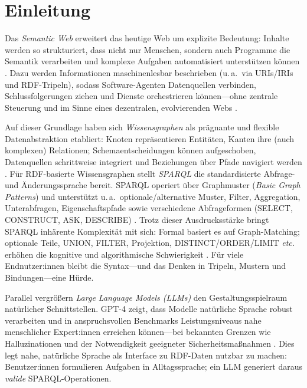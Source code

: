 
\chapter{Einleitung}\label{sec:Einleitung}

Das \emph{Semantic Web} erweitert das heutige Web um explizite Bedeutung: Inhalte werden so strukturiert, dass nicht nur Menschen, sondern auch Programme die Semantik verarbeiten und komplexe Aufgaben automatisiert unterstützen können \cite{bernersLee2001}. Dazu werden Informationen maschinenlesbar beschrieben (u.\,a.\ via URIs/IRIs und RDF-Tripeln), sodass Software-Agenten Datenquellen verbinden, Schlussfolgerungen ziehen und Dienste orchestrieren können—ohne zentrale Steuerung und im Sinne eines dezentralen, evolvierenden Webs \cite{bernersLee2001}.

Auf dieser Grundlage haben sich \emph{Wissensgraphen} als prägnante und flexible Datenabstraktion etabliert: Knoten repräsentieren Entitäten, Kanten ihre (auch komplexen) Relationen; Schemaentscheidungen können aufgeschoben, Datenquellen schrittweise integriert und Beziehungen über Pfade navigiert werden \cite{hogan2021}. Für RDF-basierte Wissensgraphen stellt \emph{SPARQL} die standardisierte Abfrage- und Änderungs\-sprache bereit. SPARQL operiert über Graphmuster (\emph{Basic Graph Patterns}) und unterstützt u.\,a.\ optionale/alternative Muster, Filter, Aggregation, Unterabfragen, Eigenschaftspfade sowie verschiedene Abfrageformen (SELECT, CONSTRUCT, ASK, DESCRIBE) \cite{w3cSparql11}. Trotz dieser Ausdrucksstärke bringt SPARQL inhärente Komplexität mit sich: Formal basiert es auf Graph-Matching; optionale Teile, UNION, FILTER, Projektion, DISTINCT/ORDER/LIMIT \emph{etc.} erhöhen die kognitive und algorithmische Schwierigkeit \cite{perezGutierrezSparql}. Für viele Endnutzer:innen bleibt die Syntax—und das Denken in Tripeln, Mustern und Bindungen—eine Hürde.

Parallel vergrößern \emph{Large Language Models (LLMs)} den Gestaltungsspielraum natürlicher Schnittstellen. GPT-4 zeigt, dass Modelle natürliche Sprache robust verarbeiten und in anspruchsvollen Benchmarks Leistungsniveaus nahe menschlicher Expert:innen erreichen können—bei bekannten Grenzen wie Halluzinationen und der Notwendigkeit geeigneter Sicherheitsmaßnahmen \cite{openaiGPT42023}. Dies legt nahe, natürliche Sprache als Interface zu RDF-Daten nutzbar zu machen: Benutzer:innen formulieren Aufgaben in Alltagssprache; ein LLM generiert daraus \emph{valide} SPARQL-Operationen.

